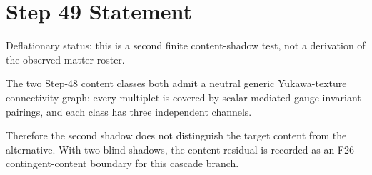 \documentclass[11pt]{article}
\begin{document}
\section*{Step 49 Statement}
Deflationary status: this is a second finite content-shadow test, not a derivation of the observed matter roster.

The two Step-48 content classes both admit a neutral generic Yukawa-texture connectivity graph: every multiplet is covered by scalar-mediated gauge-invariant pairings, and each class has three independent channels.

Therefore the second shadow does not distinguish the target content from the alternative. With two blind shadows, the content residual is recorded as an F26 contingent-content boundary for this cascade branch.
\end{document}
